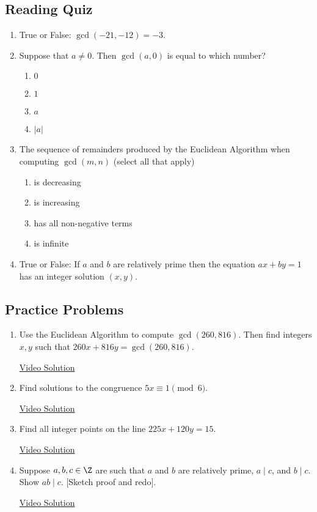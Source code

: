\subsection*{Reading Quiz}

\begin{enumerate}
    \item True or False: $\gcd(-21, -12) = -3$.
    
    \item Suppose that $a \neq 0$. Then $\gcd(a,0)$ is equal to which number?
    \begin{enumerate}
        \item $0$
        \item $1$
        \item $a$
        \item $|a|$
    \end{enumerate}
    
    \item The sequence of remainders produced by the Euclidean Algorithm when computing $\gcd(m,n)$ (select all that apply)
    \begin{enumerate}
        \item is decreasing
        \item is increasing
        \item has all non-negative terms
        \item is infinite
    \end{enumerate}
    
    \item True or False: If $a$ and $b$ are relatively prime then the equation $ax+by=1$ has an integer solution $(x,y)$.
\end{enumerate}

\subsection*{Practice Problems}

\begin{enumerate}\renewcommand{\labelenumi}{\thesubsection.\theenumi}
    \item Use the Euclidean Algorithm to compute $\gcd(260,816)$. Then find integers $x,y$ such that $260x + 816y = \gcd(260,816)$.
    
    \href{https://youtu.be/L-p2fBqYgi0}{Video Solution}
    
    \item Find solutions to the congruence $5x \equiv 1 \pmod 6$.
    
    \href{https://youtu.be/pCvM5FMgM0c}{Video Solution}
    
    \item Find all integer points on the line $225x + 120y = 15$.
    
    \href{https://youtu.be/WYNwDsiaD7M}{Video Solution}
    
    \item Suppose $a,b,c \in \Z$ are such that $a$ and $b$ are relatively prime, $a \mid c$, and $b \mid c$. Show $ab \mid c$. [Sketch proof and redo].
    
    \href{https://youtu.be/s5OA-h5GJh0}{Video Solution}
\end{enumerate}

